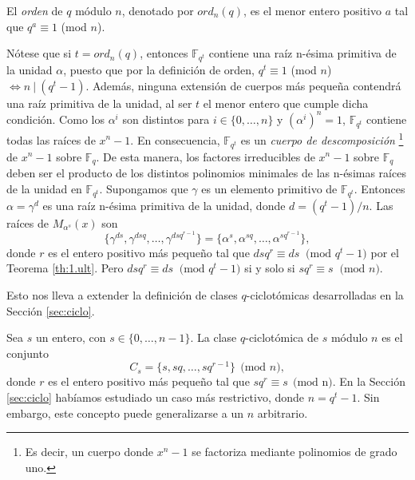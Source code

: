 \begin{definicion}
    El \emph{orden} de $q$ módulo $n$, denotado por $ord_n(q)$,  es el menor entero positivo $a$ tal que $q^a \equiv 1$ (mod $n$).
\end{definicion}

Nótese que si $t = ord_n(q)$, entonces $\mathbb{F}_{q^t}$ contiene una raíz n-ésima primitiva de la unidad $\alpha$, puesto que por la definición de orden, $q^t \equiv 1$ (mod $n$) $\Leftrightarrow n \ | \ (q^t - 1)$. Además, ninguna extensión de cuerpos más pequeña contendrá una raíz primitiva de la unidad, al ser $t$ el menor entero que cumple dicha condición. Como los $\alpha^i$ son distintos para $i \in \{0,\dots, n\}$ y $(\alpha^i)^n = 1$, $\mathbb{F}_{q^t}$ contiene todas las raíces de $x^n - 1$. En consecuencia, $\mathbb{F}_{q^t}$ es un \emph{cuerpo de descomposición} \footnote{Es decir, un cuerpo donde $x^n-1$ se factoriza mediante polinomios de grado uno.} de $x^n - 1$ sobre $\mathbb{F}_{q}$. De esta manera, los factores irreducibles de $x^n - 1$ sobre $\mathbb{F}_{q}$ deben ser el producto de los distintos polinomios minimales de las n-ésimas raíces de la unidad en $\mathbb{F}_{q^t}$. Supongamos que $\gamma$ es un elemento primitivo de $\mathbb{F}_{q^t}$. Entonces $\alpha = \gamma^d$ es una raíz n-ésima primitiva de la unidad, donde $d = (q^t - 1)/n$. Las raíces de $M_{\alpha^s}(x)$ son $$\{\gamma^{ds},\gamma^{dsq},\dots,\gamma^{dsq^{r-1}}\} = \{\alpha^s,\alpha^{sq},\dots,\alpha^{sq^{r-1}}\},$$ donde $r$ es el entero positivo más pequeño tal que $dsq^r \equiv ds \ \text{  (mod $q^t-1$)}$ por el Teorema \ref{th:1.ult}. Pero $dsq^r \equiv ds \ \text{  (mod $q^t-1$)}$ si y solo si $sq^r \equiv s \ \text{  (mod $n$)}$.

Esto nos lleva a extender la definición de clases $q$-ciclotómicas desarrolladas en la Sección \ref{sec:ciclo}.

Sea $s$ un entero, con $s \in \{0,\dots,n-1\}$. La clase $q$-ciclotómica de $s$ módulo $n$ es el conjunto
$$C_s = \{s,sq,\dots,sq^{r-1}\} \ \ \text{(mod }n),$$
donde $r$ es el entero positivo más pequeño tal que $sq^r \equiv s \ \ \text{(mod n)}$. En la Sección \ref{sec:ciclo} habíamos estudiado un caso más restrictivo, donde $n = q^t - 1$. Sin embargo, este concepto puede generalizarse a un $n$ arbitrario.

